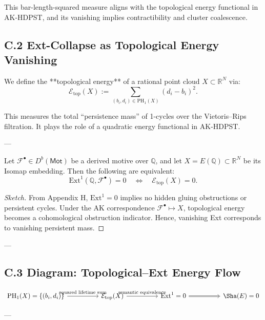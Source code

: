 This bar-length-squared measure aligns with the topological energy functional in AK-HDPST, and its vanishing implies contractibility and cluster coalescence.

\subsection*{C.2 Ext-Collapse as Topological Energy Vanishing}

We define the **topological energy** of a rational point cloud \( X \subset \mathbb{R}^N \) via:
\[
\mathcal{E}_{\text{top}}(X) := \sum_{(b_i, d_i) \in \mathrm{PH}_1(X)} (d_i - b_i)^2.
\]

This measures the total “persistence mass” of 1-cycles over the Vietoris–Rips filtration.  
It plays the role of a quadratic energy functional in AK-HDPST.

---

\begin{lemma}
Let \( \mathcal{F}^\bullet \in D^b(\mathsf{Mot}) \) be a derived motive over \( \mathbb{Q} \),  
and let \( X = E(\mathbb{Q}) \subset \mathbb{R}^N \) be its Isomap embedding.  
Then the following are equivalent:
\[
\mathrm{Ext}^1(\mathbb{Q}, \mathcal{F}^\bullet) = 0 \quad \Leftrightarrow \quad \mathcal{E}_{\text{top}}(X) = 0.
\]
\end{lemma}

\begin{proof}[Sketch]
From Appendix H, \( \mathrm{Ext}^1 = 0 \) implies no hidden gluing obstructions or persistent cycles.  
Under the AK correspondence \( \mathcal{F}^\bullet \mapsto X \), topological energy becomes a cohomological obstruction indicator.  
Hence, vanishing Ext corresponds to vanishing persistent mass.
\end{proof}

---

\subsection*{C.3 Diagram: Topological–Ext Energy Flow}

\[
\begin{tikzcd}[row sep=large, column sep=huge]
\mathrm{PH}_1(X) = \{(b_i, d_i)\} \arrow[r, "\text{squared lifetime sum}"] &
\mathcal{E}_{\text{top}}(X) \arrow[r, "\text{semantic equivalence}"] &
\mathrm{Ext}^1 = 0 \arrow[r, Rightarrow] &
\Sha(E) = 0
\end{tikzcd}
\]

---

